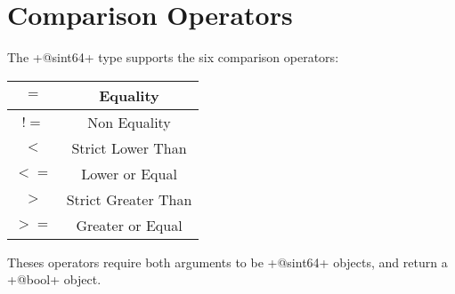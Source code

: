 \section{Comparison Operators}

The \ggs+@sint64+ type supports the six comparison operators:\newline

\begin{tabular}{|c|c|}
\hline
$=$ & Equality \\
\hline
$!=$ & Non Equality \\
\hline
$<$  & Strict Lower Than \\
\hline
$<=$  & Lower or Equal \\
\hline
$>$  & Strict Greater Than \\
\hline
$>=$  & Greater or Equal \\
\hline
\end{tabular}

Theses operators require both arguments to be \ggs+@sint64+ objects, and return a \ggs+@bool+ object.


